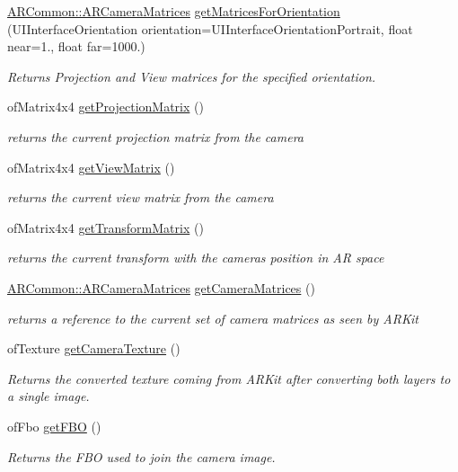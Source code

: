 \begin{DoxyCompactItemize}
\mbox{\hyperlink{struct_a_r_common_1_1_a_r_camera_matrices}{A\+R\+Common\+::\+A\+R\+Camera\+Matrices}} \mbox{\hyperlink{class_a_r_core_1_1_a_r_cam_a0061e3c56e3d30e6fec64235d9397809}{get\+Matrices\+For\+Orientation}} (U\+I\+Interface\+Orientation orientation=U\+I\+Interface\+Orientation\+Portrait, float near=1., float far=1000.)
\begin{DoxyCompactList}\small\item\em Returns Projection and View matrices for the specified orientation. \end{DoxyCompactList}\item 
of\+Matrix4x4 \mbox{\hyperlink{class_a_r_core_1_1_a_r_cam_a19409c89b0bcbaad62e5d405d194f8a7}{get\+Projection\+Matrix}} ()
\begin{DoxyCompactList}\small\item\em returns the current projection matrix from the camera \end{DoxyCompactList}\item 
of\+Matrix4x4 \mbox{\hyperlink{class_a_r_core_1_1_a_r_cam_a7ca28300844875464c7821620665d3b5}{get\+View\+Matrix}} ()
\begin{DoxyCompactList}\small\item\em returns the current view matrix from the camera \end{DoxyCompactList}\item 
of\+Matrix4x4 \mbox{\hyperlink{class_a_r_core_1_1_a_r_cam_a280c37d6b4aa16169637cf3f5332c9d3}{get\+Transform\+Matrix}} ()
\begin{DoxyCompactList}\small\item\em returns the current transform with the camera\textquotesingle{}s position in AR space \end{DoxyCompactList}\item 
\mbox{\hyperlink{struct_a_r_common_1_1_a_r_camera_matrices}{A\+R\+Common\+::\+A\+R\+Camera\+Matrices}} \mbox{\hyperlink{class_a_r_core_1_1_a_r_cam_a1398ffe9720425cfbc99635b08bc80d6}{get\+Camera\+Matrices}} ()
\begin{DoxyCompactList}\small\item\em returns a reference to the current set of camera matrices as seen by A\+R\+Kit \end{DoxyCompactList}\item 
of\+Texture \mbox{\hyperlink{class_a_r_core_1_1_a_r_cam_ae816096383bfc8fbcf6b67ab82b3d629}{get\+Camera\+Texture}} ()
\begin{DoxyCompactList}\small\item\em Returns the converted texture coming from A\+R\+Kit after converting both layers to a single image. \end{DoxyCompactList}\item 
of\+Fbo \mbox{\hyperlink{class_a_r_core_1_1_a_r_cam_a4c8f3c9b55f5852dc7a8554fe6ac0888}{get\+F\+BO}} ()
\begin{DoxyCompactList}\small\item\em Returns the F\+BO used to join the camera image. \end{DoxyCompactList}\end{DoxyCompactItemize}
